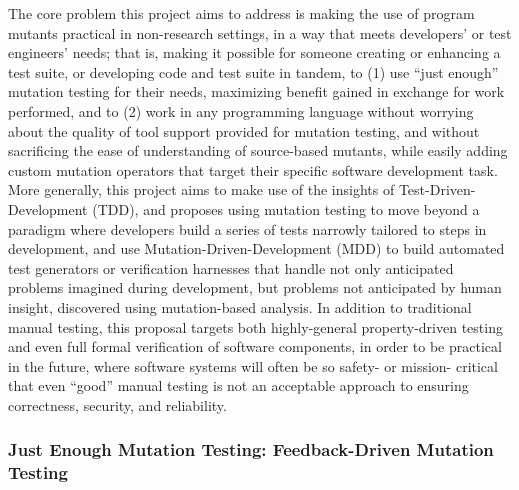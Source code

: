 The core problem this project aims to address is making the use of program mutants practical in non-research settings, in a way that meets developers' or test engineers' needs; that is, making it possible for someone creating or enhancing a test suite, or developing code and test suite in tandem, to (1) use ``just enough'' mutation testing for their needs, maximizing benefit gained in exchange for work performed, and to (2) work in any programming language without worrying about the quality of tool support provided for mutation testing, and without sacrificing the ease of understanding of source-based mutants, while easily adding custom mutation operators that target their specific software development task.  More generally, this project aims to make use of the insights of Test-Driven-Development (TDD), and proposes using mutation testing to move beyond a paradigm where developers build a series of tests narrowly tailored to steps in development, and use Mutation-Driven-Development (MDD) to build automated test generators or verification harnesses that handle not only anticipated problems imagined during development, but problems not anticipated by human insight, discovered using mutation-based analysis.  In addition to traditional manual testing, this proposal targets both highly-general property-driven testing and even full formal verification of software components, in order to be practical in the future, where software systems will often be so safety- or mission- critical that even ``good'' manual testing is not an acceptable approach to ensuring correctness, security, and reliability.

\subsubsection{Just Enough Mutation Testing: Feedback-Driven Mutation Testing}

